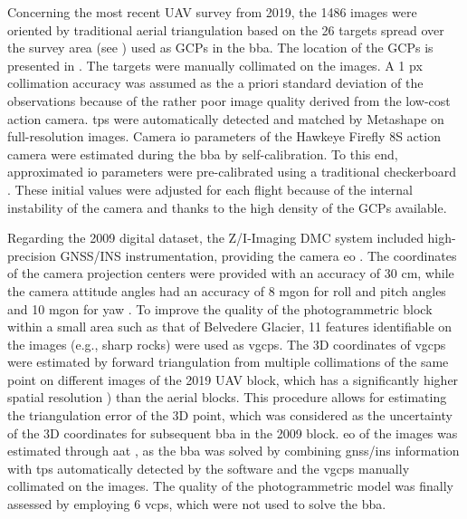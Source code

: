 Concerning the most recent UAV survey from 2019, the 1486 images were oriented by traditional aerial triangulation based on the 26 targets spread over the survey area (see ) used as GCPs in the \ac{bba}.
The location of the GCPs is presented in .
The targets were manually collimated on the images. 
A 1 px collimation accuracy was assumed as the a priori standard deviation of the observations because of the rather poor image quality derived from the low-cost action camera. 
\Acp{tp} were automatically detected and matched by Metashape on full-resolution images.
Camera \ac{io} parameters of the Hawkeye Firefly 8S action camera were estimated during the \ac{bba} by self-calibration. 
To this end, approximated \ac{io} parameters were pre-calibrated using a traditional checkerboard \cite{zhang_flexible_2000}. 
These initial values were adjusted for each flight because of the internal instability of the camera and thanks to the high density of the GCPs available.

Regarding the 2009 digital dataset, the Z/I-Imaging DMC system included high-precision GNSS/INS instrumentation, providing the camera \ac{eo} \citep{Hinz2001}. 
The coordinates of the camera projection centers were provided with an accuracy of 30 cm, while the camera attitude angles had an accuracy of 8 mgon for roll and pitch angles and 10 mgon for yaw \citep{Forlani_pinto2001}.
To improve the quality of the photogrammetric block within a small area such as that of Belvedere Glacier, 11 features identifiable on the images (e.g., sharp rocks) were used as \acp{vgcp}. 
The 3D coordinates of \acp{vgcp} were estimated by forward triangulation from multiple collimations of the same point on different images of the 2019 UAV block, which has a significantly higher spatial resolution  ) than the aerial blocks.
This procedure allows for estimating the triangulation error of the 3D point, which was considered as the uncertainty of the 3D coordinates for subsequent \ac{bba} in the 2009 block.
\Ac{eo} of the images was estimated through \ac{aat} \citep{ioli2021_lowcost_dgps}, as the \ac{bba} was solved by combining \ac{gnss}/\ac{ins} information with \acp{tp} automatically detected by the software and the \acp{vgcp} manually collimated on the images. 
The quality of the photogrammetric model was finally assessed by employing 6 \acp{vcp}, which were not used to solve the \ac{bba}. 

